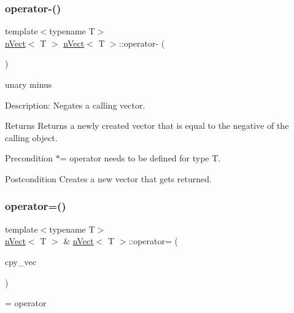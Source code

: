 \subsubsection{\texorpdfstring{operator-\/()}{operator-()}\hspace{0.1cm}{\footnotesize\ttfamily [2/2]}}
{\footnotesize\ttfamily template$<$typename T$>$ \\
\hyperlink{classnVect}{n\+Vect}$<$ T $>$ \hyperlink{classnVect}{n\+Vect}$<$ T $>$\+::operator-\/ (\begin{DoxyParamCaption}{ }\end{DoxyParamCaption})}



unary minus 

Description\+: Negates a calling vector. \begin{DoxyReturn}{Returns}
Returns a newly created vector that is equal to the negative of the calling object. 
\end{DoxyReturn}
\begin{DoxyPrecond}{Precondition}
$\ast$= operator needs to be defined for type T. 
\end{DoxyPrecond}
\begin{DoxyPostcond}{Postcondition}
Creates a new vector that gets returned. 
\end{DoxyPostcond}
\mbox{\label{classnVect_a47cd80bc62dec71439736d6f0218d57e}} 
\subsubsection{\texorpdfstring{operator=()}{operator=()}}
{\footnotesize\ttfamily template$<$typename T$>$ \\
\hyperlink{classnVect}{n\+Vect}$<$ T $>$ \& \hyperlink{classnVect}{n\+Vect}$<$ T $>$\+::operator= (\begin{DoxyParamCaption}\item[{const \hyperlink{classnVect}{n\+Vect}$<$ T $>$ \&}]{cpy\+\_\+vec }\end{DoxyParamCaption})}



= operator 

